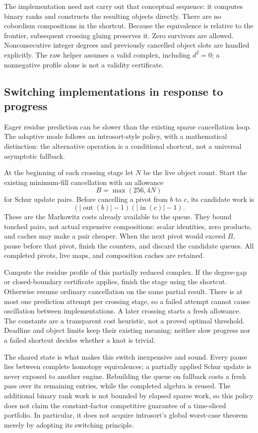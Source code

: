 The implementation need not carry out that conceptual sequence: it
computes binary ranks and constructs the resulting objects directly.
There are no cobordism compositions in the shortcut. Because the
equivalence is relative to the frontier, subsequent crossing gluing
preserves it. Zero survivors are allowed. Nonconsecutive integer
degrees and previously cancelled object slots are handled explicitly.
The raw helper assumes a valid complex, including $d^2=0$; a nonnegative
profile alone is not a validity certificate.

\subsection{Switching implementations in response to progress}
Eager residue prediction can be slower than the existing sparse
cancellation loop. The adaptive mode follows an introsort-style
policy, with a mathematical distinction: the alternative operation
is a conditional shortcut, not a universal asymptotic fallback.

At the beginning of each crossing stage let $N$ be the live object
count. Start the existing minimum-fill cancellation with an allowance
\[
 B=\max(256,4N)
\]
for Schur update pairs. Before cancelling a pivot from $b$ to $c$,
its candidate work is
\[
  (|\operatorname{out}(b)|-1)(|\operatorname{in}(c)|-1).
\]
These are the Markowitz costs already available to the queue. They
bound touched pairs, not actual expensive compositions: scalar
identities, zero products, and caches may make a pair cheaper.
When the next pivot would exceed $B$, pause before that pivot,
finish the counters, and discard the candidate queues. All completed
pivots, live maps, and composition caches are retained.

Compute the residue profile of this partially reduced complex. If
the degree-gap or closed-boundary certificate applies, finish the
stage using the shortcut. Otherwise resume ordinary cancellation
on the same partial result. There is at most one prediction attempt
per crossing stage, so a failed attempt cannot cause oscillation
between implementations. A later crossing starts a fresh allowance.
The constants are a transparent cost heuristic, not a proved optimal
threshold. Deadline and object limits keep their existing meaning;
neither slow progress nor a failed shortcut decides whether a knot
is trivial.

The shared state is what makes this switch inexpensive and sound.
Every pause lies between complete homotopy equivalences; a partially
applied Schur update is never exposed to another engine. Rebuilding
the queue on fallback costs a fresh pass over its remaining entries,
while the completed algebra is reused. The additional binary rank
work is not bounded by elapsed sparse work, so this policy does not
claim the constant-factor competitive guarantee of a time-sliced
portfolio. In particular, it does not acquire introsort's global
worst-case theorem merely by adopting its switching principle.


